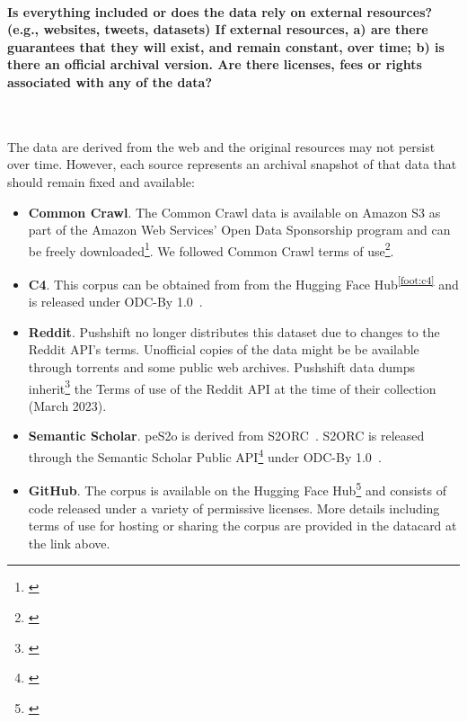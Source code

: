 \documentclass{article}
\newcommand*{\fnref}[1]{\textsuperscript{\ref{#1}}}
\begin{document}
\paragraph{Is everything included or does the data rely on external resources? (e.g., websites, tweets, datasets) If external resources, a) are there guarantees that they will exist, and remain constant, over time; b) is there an official archival version. Are there licenses, fees or rights associated with any of the data?}~

The data are derived from the web and the original resources may not persist over time. However, each source represents an archival snapshot of that data that should remain fixed and available: 

\begin{itemize}[leftmargin=1em]
    \item \textbf{Common Crawl}. The Common Crawl data is available on Amazon S3 as part of the Amazon Web Services’ Open Data Sponsorship program and can be freely downloaded\footnote{\href{https://commoncrawl.org/the-data/get-started/}{}}. 
    We followed Common Crawl terms of use\footnote{\label{foot:cc-start}\href{https://commoncrawl.org/terms-of-use/}{}}.
    \item \textbf{C4}. This corpus can be obtained from from the Hugging Face Hub\fnref{foot:c4} and is released under ODC-By 1.0~\citep{odc-by}. 
    \item \textbf{Reddit}. Pushshift no longer distributes this dataset due to changes to the Reddit API's terms. Unofficial copies of the data might be be available through torrents and some public web archives. Pushshift data dumps inherit\footnote{\href{https://www.reddit.com/r/pushshift/comments/d6luj5/comment/f0ugpqp}{}} the Terms of use of the Reddit API at the time of their collection (March 2023).
    \item \textbf{Semantic Scholar}. peS2o is derived from S2ORC~\citep{lo-etal-2020-s2orc}. S2ORC is released through the Semantic Scholar Public API\footnote{\href{https://www.semanticscholar.org/product/api}{}} under ODC-By 1.0~\citep{odc-by}.
    \item \textbf{GitHub}. The corpus is available on the Hugging Face Hub\footnote{\label{foot:stack}\href{https://huggingface.co/datasets/bigcode/the-stack-dedup}{}} and consists of code released under a variety of permissive licenses. More details including terms of use for hosting or sharing the corpus are provided in the datacard at the link above.

\end{itemize}
\end{document}
